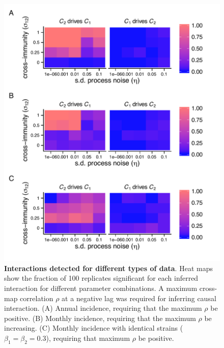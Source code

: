 \documentclass[10pt]{article}
\begin{document}
\begin{figure}
\begin{center}
  \includegraphics[width=5in]{dataflow/out/fig_detect_diffdata_lag/fig_detect_diffdata_lag.pdf}
  \end{center}
  \caption{\textbf{Interactions detected for different types of data}. Heat maps show the fraction of 100 replicates significant for each inferred interaction for different parameter combinations. A maximum cross-map correlation $\rho$ at a negative lag was required for inferring causal interaction. (A) Annual incidence, requiring that the maximum $\rho$ be positive. (B) Monthly incidence, requiring that the maximum $\rho$ be increasing. (C) Monthly incidence with identical strains ($\beta_1=\beta_2=0.3$), requiring that maximum $\rho$ be positive.  \label{fig:good_heatmaps_tmp}}
\end{figure}
\end{document}
